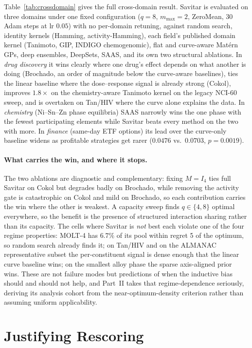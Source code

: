 \documentclass{article}
\begin{document}
Table~\ref{tab:crossdomain} gives the full cross-domain result.
Savitar is evaluated on three domains under one fixed configuration
($q = 8$, $m_{\max} = 2$, ZeroMean, 30 Adam steps at lr $0.05$) with no
per-domain retuning, against random search, identity kernels (Hamming,
activity-Hamming), each field's published domain kernel (Tanimoto, GIP,
INDIGO chemogenomic), flat and curve-aware Mat\'ern GPs, deep ensembles,
DeepSets, SAAS, and its own two structural ablations. In \emph{drug
discovery} it wins clearly where one drug's effect depends on what another
is doing (Brochado, an order of magnitude below the curve-aware baselines),
ties the linear baseline where the dose--response signal is already strong
(Cokol), improves $1.8\times$ on the chemistry-aware Tanimoto kernel on the
legacy NCI-60 sweep, and is overtaken on Tan/HIV where the curve alone
explains the data. In \emph{chemistry} (Ni--Sn--Zn phase equilibria) SAAS
narrowly wins the one phase with the fewest participating elements while
Savitar beats every method on the two with more. In \emph{finance}
(same-day ETF options) its lead over the curve-only baseline widens as
profitable strategies get rarer ($0.0476$ vs.\ $0.0703$, $p = 0.0019$).

\paragraph{What carries the win, and where it stops.} The two ablations are
diagnostic and complementary: fixing $M = I_4$ ties full Savitar on Cokol
but degrades badly on Brochado, while removing the activity gate is
catastrophic on Cokol and mild on Brochado, so each contribution carries the
win where the other is weakest. A capacity sweep finds $q \in \{4,8\}$
optimal everywhere, so the benefit is the presence of structured interaction
sharing rather than its capacity. The cells where Savitar is \emph{not} best
each violate one of the four regime properties: MOLT-4 has $6.7\%$ of its
pool within regret 5 of the optimum, so random search already finds it; on
Tan/HIV and on the ALMANAC representative subset the per-constituent signal
is dense enough that the linear curve baseline wins; on the smallest alloy
phase the sparse axis-aligned prior wins. These are not failure
modes but predictions of when the inductive bias should and should not
help, and Part~II takes that regime-dependence seriously, deriving its
analysis cohort from the near-optimum-density criterion rather than assuming
uniform applicability.

\section{Justifying Rescoring}
\label{sec:pde-intro}
\end{document}
